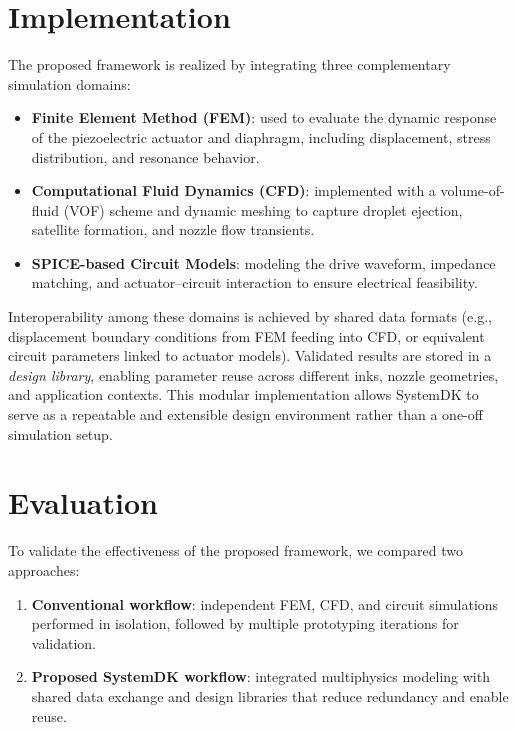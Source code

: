 \documentclass[conference]{IEEEtran}
\begin{document}
\section{Implementation}
The proposed framework is realized by integrating three complementary simulation domains:

\begin{itemize}
  \item \textbf{Finite Element Method (FEM)}: used to evaluate the dynamic response of the piezoelectric actuator and diaphragm, including displacement, stress distribution, and resonance behavior.
  \item \textbf{Computational Fluid Dynamics (CFD)}: implemented with a volume-of-fluid (VOF) scheme and dynamic meshing to capture droplet ejection, satellite formation, and nozzle flow transients.
  \item \textbf{SPICE-based Circuit Models}: modeling the drive waveform, impedance matching, and actuator–circuit interaction to ensure electrical feasibility.
\end{itemize}

Interoperability among these domains is achieved by shared data formats (e.g., displacement boundary conditions from FEM feeding into CFD, or equivalent circuit parameters linked to actuator models). 
Validated results are stored in a \emph{design library}, enabling parameter reuse across different inks, nozzle geometries, and application contexts. 
This modular implementation allows SystemDK to serve as a repeatable and extensible design environment rather than a one-off simulation setup.

\section{Evaluation}
To validate the effectiveness of the proposed framework, we compared two approaches:  
\begin{enumerate}
  \item \textbf{Conventional workflow}: independent FEM, CFD, and circuit simulations performed in isolation, followed by multiple prototyping iterations for validation.  
  \item \textbf{Proposed SystemDK workflow}: integrated multiphysics modeling with shared data exchange and design libraries that reduce redundancy and enable reuse.  
\end{enumerate}
\end{document}
